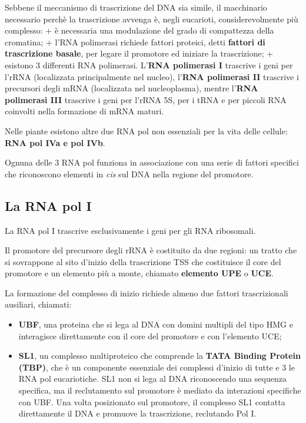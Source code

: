 \documentclass[11pt]{book}
\begin{document}
Sebbene il meccanismo di trascrizione del DNA sia simile, il macchinario
necessario perchè la trascrizione avvenga è, negli eucarioti,
considerevolmente più complesso: + è necessaria una modulazione del
grado di compattezza della cromatina; + l'RNA polimerasi richiede
fattori proteici, detti \textbf{fattori di trascrizione basale}, per
legare il promotore ed iniziare la trascrizione; + esistono 3 differenti
RNA polimerasi. L'\textbf{RNA polimerasi I} trascrive i geni per l'rRNA
(localizzata principalmente nel nucleo), l'\textbf{RNA polimerasi II}
trascrive i precursori degli mRNA (localizzata nel nucleoplasma), mentre
l'\textbf{RNA polimerasi III} trascrive i geni per l'rRNA 5S, per i tRNA
e per piccoli RNA coinvolti nella formazione di mRNA maturi.

Nelle piante esistono altre due RNA pol non essenziali per la vita delle
cellule: \textbf{RNA pol IVa e pol IVb}.

Ognuna delle 3 RNA pol funziona in associazione con una serie di fattori
specifici che riconoscono elementi in \emph{cis} sul DNA nella regione
del promotore.

\subsection{La RNA pol I}\label{la-rna-pol-i}

La RNA pol I trascrive esclusivamente i geni per gli RNA ribosomali.

Il promotore del precursore degli rRNA è costituito da due regioni: un
tratto che si sovrappone al sito d'inizio della trascrizione TSS che
costituisce il core del promotore e un elemento più a monte, chiamato
\textbf{elemento UPE} o \textbf{UCE}.

La formazione del complesso di inizio richiede almeno due fattori
trascrizionali ausiliari, chiamati:

\begin{itemize}
\itemsep1pt\parskip0pt
\item
  \textbf{UBF}, una proteina che si lega al DNA con domini multipli del
  tipo HMG e interagisce direttamente con il core del promotore e con
  l'elemento UCE;
\item
  \textbf{SL1}, un complesso multiproteico che comprende la \textbf{TATA
  Binding Protein (TBP)}, che è un componente essenziale dei complessi
  d'inizio di tutte e 3 le RNA pol eucariotiche. SL1 non si lega al DNA
  riconoscendo una sequenza specifica, ma il reclutamento sul promotore
  è mediato da interazioni specifiche con UBF. Una volta posizionato sul
  promotore, il complesso SL1 contatta direttamente il DNA e promuove la
  trascrizione, reclutando Pol I.
\end{itemize}
\end{document}

